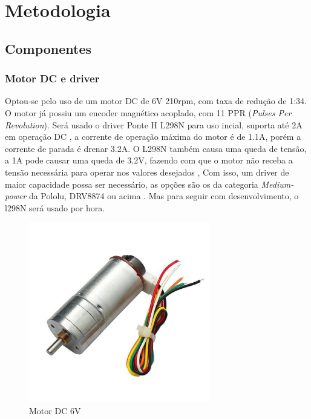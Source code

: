 

\chapter{Metodologia}

\section{Componentes}

\subsection{Motor DC e driver}
Optou-se pelo uso de um motor DC de 6V 210rpm, com taxa de redução de 1:34. O motor já possiu um encoder magnético acoplado, com 11 PPR (\textit{Pulses Per Revolution}).
Será usado o driver Ponte H L298N para uso incial, suporta até 2A em operação DC \cite{datasheel_l298n}, a corrente de operação máxima do motor é de 1.1A, 
porém a corrente de parada é drenar 3.2A.
O L298N também causa uma queda de tensão, a 1A pode causar uma queda de 3.2V, fazendo com que o motor não receba a tensão necessária para operar nos valores desejados \cite{datasheel_l298n},
Com isso, um driver de maior capacidade possa ser necessário, as opções são os da categoria \textit{Medium-power} da Pololu, DRV8874 ou acima \cite{DRV8874}.
Mas para seguir com desenvolvimento, o l298N será usado por hora.

\begin{figure}[h]
	\centering
	\includegraphics[width=0.7\textwidth]{figures/CHR_GM25_370}
	\caption{Motor DC 6V \cite{motor_dc_6v_encoder}}
\end{figure}


